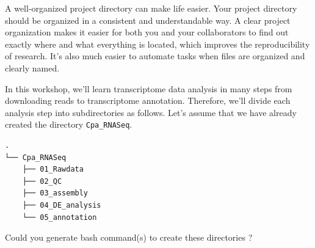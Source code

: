 \documentclass[
  letterpaper,
  DIV=11,
  numbers=noendperiod]{scrreprt}
\begin{document}
\begin{tcolorbox}[enhanced jigsaw, breakable, bottomrule=.15mm, left=2mm, coltitle=black, opacityback=0, colframe=quarto-callout-note-color-frame, toprule=.15mm, opacitybacktitle=0.6, colbacktitle=quarto-callout-note-color!10!white, bottomtitle=1mm, colback=white, toptitle=1mm, titlerule=0mm, rightrule=.15mm, arc=.35mm, title=\textcolor{quarto-callout-note-color}{\faInfo}\hspace{0.5em}{Activity}, leftrule=.75mm]

A well-organized project directory can make life easier. Your project
directory should be organized in a consistent and understandable way. A
clear project organization makes it easier for both you and your
collaborators to find out exactly where and what everything is located,
which improves the reproducibility of research. It's also much easier to
automate tasks when files are organized and clearly named.

In this workshop, we'll learn transcriptome data analysis in many steps
from downloading reads to transcriptome annotation. Therefore, we'll
divide each analysis step into subdirectories as follows. Let's assume
that we have already created the directory \texttt{Cpa\_RNASeq}.

\begin{verbatim}
.
└── Cpa_RNASeq
    ├── 01_Rawdata
    ├── 02_QC
    ├── 03_assembly
    ├── 04_DE_analysis
    └── 05_annotation
\end{verbatim}

Could you generate bash command(s) to create these directories ?

\end{tcolorbox}
\end{document}
